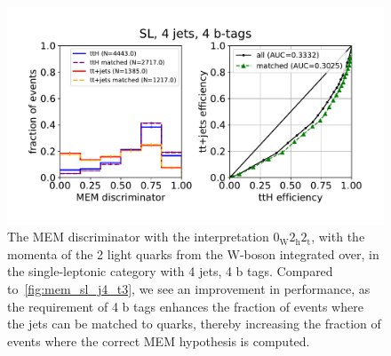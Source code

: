 \begin{figure}
\begin{centering}
\includegraphics[width = 1.0\textwidth]{figures/mem_sl_j4_t4.pdf}
\caption{The MEM discriminator with the interpretation $0_{\mathrm{W}} 2_{\mathrm{h}} 2_{\mathrm{t}}$, with the momenta of the 2 light quarks from the $\mathrm{W}$-boson integrated over, in the single-leptonic category with 4 jets, 4 b tags. Compared to~\cref{fig:mem_sl_j4_t3}, we see an improvement in performance, as the requirement of 4 b tags enhances the fraction of events where the jets can be matched to quarks, thereby increasing the fraction of events where the correct MEM hypothesis is computed.}
\label{fig:mem_sl_j4_t4}
\end{centering}
\end{figure}

